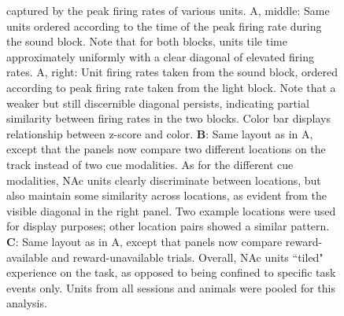 \documentclass[11pt]{article}
\newcommand{\bsf}[1]{\textbf{#1}}
\begin{document}
\begin{figure}[ht!]
{captured by the peak firing rates of various units. A, middle: Same units
ordered according to the time of the peak firing rate during the sound
block. Note that for both blocks, units tile time approximately uniformly with
a clear diagonal of elevated firing rates. A, right: Unit firing rates
taken from the sound block, ordered according to peak firing rate taken from
the light block. Note that a weaker but still discernible diagonal persists,
indicating partial similarity between firing rates in the two blocks. Color bar displays relationship between z-score and color. \bsf{B}: Same layout as in
A, except that the panels now compare two different locations on the track
instead of two cue modalities. As for the different cue modalities, NAc units
clearly discriminate between locations, but also maintain some similarity
across locations, as evident from the visible diagonal in the right panel. Two
example locations were used for display purposes; other location pairs showed
a similar pattern. \bsf{C}: Same layout as in A, except that panels now
compare reward-available and reward-unavailable trials. Overall, NAc units
``tiled" experience on the task, as opposed to being confined to specific task
events only. Units from all sessions and animals were pooled for this
analysis.}
\label{fig:tiling}
\end{figure} \clearpage
\end{document}
